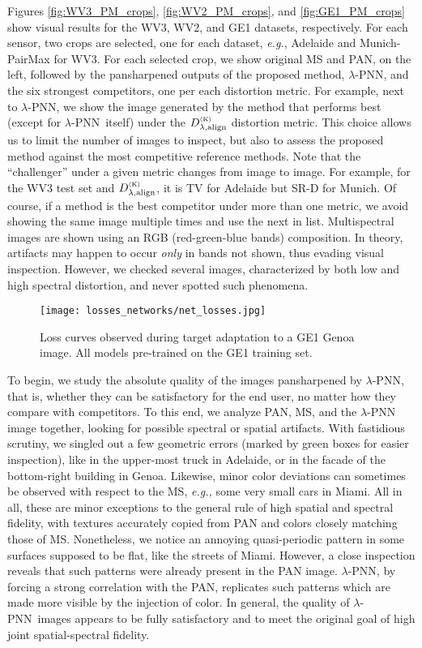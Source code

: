\documentclass[journal]{IEEEtran}
\newcommand{\DLa}{D^{_{\rm (K)}}_{\lambda, \rm align}}
\newcommand{\LPNN}  {$\lambda$-PNN}
\begin{document}
Figures \ref{fig:WV3_PM_crops}, \ref{fig:WV2_PM_crops}, and \ref{fig:GE1_PM_crops} show visual results for the WV3, WV2, and GE1 datasets, respectively.
For each sensor, two crops are selected, one for each dataset, {\it e.g.}, Adelaide and Munich-PairMax for WV3.
For each selected crop,
we show original MS and PAN, on the left,
followed by the pansharpened outputs of the proposed method, \LPNN, and the six strongest competitors, one per each distortion metric.
For example, next to \LPNN, we show the image generated by the method that performs best (except for \LPNN\ itself) under the $\DLa$ distortion metric.
This choice allows us to limit the number of images to inspect,
but also to assess the proposed method against the most competitive reference methods.
Note that the ``challenger'' under a given metric changes from image to image.
For example, for the WV3 test set and $\DLa$, it is TV for Adelaide but SR-D for Munich.
Of course, if a method is the best competitor under more than one metric, we avoid showing the same image multiple times and use the next in list.
Multispectral images are shown using an RGB (red-green-blue bands) composition.
In theory, artifacts may happen to occur {\em only} in bands not shown, thus evading visual inspection.
However, we checked several images, characterized by both low and high spectral distortion, and never spotted such phenomena.

\begin{figure*}[htbp]
\centering
\texttt{[image: losses\_networks/net\_losses.jpg]}
\caption{Loss curves observed during target adaptation to a GE1 Genoa image. All models pre-trained on the GE1 training set.}
\label{fig:network_effects}
\end{figure*}

To begin, we study the absolute quality of the images pansharpened by \LPNN,
that is, whether they can be satisfactory for the end user, no matter how they compare with competitors.
To this end, we analyze PAN, MS, and the {\LPNN} image together, looking for possible spectral or spatial artifacts.
With fastidious scrutiny, we singled out a few geometric errors (marked by green boxes for easier inspection), like in the upper-most truck in Adelaide,
or in the facade of the bottom-right building in Genoa.
Likewise, minor color deviations can sometimes be observed with respect to the MS, {\it e.g.,} some very small cars in Miami.
All in all, these are minor exceptions to the general rule of high spatial and spectral fidelity,
with textures accurately copied from PAN and colors closely matching those of MS.
Nonetheless, we notice an annoying quasi-periodic pattern in some surfaces supposed to be flat, like the streets of Miami.
However, a close inspection reveals that such patterns were already present in the PAN image.
\LPNN, by forcing a strong correlation with the PAN, replicates such patterns which are made more visible by the injection of color.
In general, the quality of \LPNN\ images appears to be fully satisfactory and to meet the original goal of high joint spatial-spectral fidelity.
\end{document}
